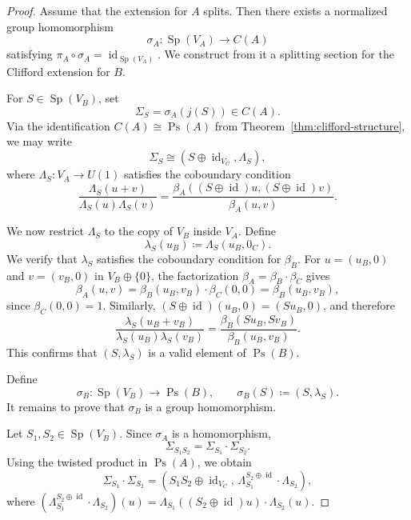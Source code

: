 \documentclass[11pt, reqno]{amsart}
\theoremstyle{definition}
\theoremstyle{remark}
\DeclareMathOperator{\Sp}{Sp}
\DeclareMathOperator{\Ps}{Ps}
\DeclareMathOperator{\id}{id}
\begin{document}
\begin{proof}
Assume that the extension for $A$ splits. Then there exists a normalized group homomorphism
\[
\sigma_A: \Sp(V_A) \to C(A)
\]
satisfying $\pi_A \circ \sigma_A = \id_{\Sp(V_A)}$. We construct from it a splitting section for the Clifford extension for $B$.

For $S \in \Sp(V_B)$, set
\[
\Sigma_S = \sigma_A(j(S)) \in C(A).
\]
Via the identification $C(A)\cong \Ps(A)$ from Theorem~\ref{thm:clifford-structure}, we may write
\begin{equation}
\Sigma_S \cong (S \oplus \id_{V_C}, \Lambda_S),
\end{equation}
where $\Lambda_S: V_A \to U(1)$ satisfies the coboundary condition
\begin{equation}
\frac{\Lambda_S(u+v)}{\Lambda_S(u)\Lambda_S(v)} = \frac{\beta_A((S\oplus \id)u, (S\oplus \id)v)}{\beta_A(u, v)}.
\end{equation}

We now restrict $\Lambda_S$ to the copy of $V_B$ inside $V_A$. Define
\begin{equation}
\lambda_S(u_B) \coloneqq \Lambda_S(u_B, 0_C).
\end{equation}
We verify that $\lambda_S$ satisfies the coboundary condition for $\beta_B$. For $u=(u_B,0)$ and $v=(v_B,0)$ in $V_B\oplus \{0\}$, the factorization $\beta_A=\beta_B\cdot \beta_C$ gives
\begin{equation}
\beta_A(u, v) = \beta_B(u_B, v_B) \cdot \beta_C(0, 0) = \beta_B(u_B, v_B),
\end{equation}
since $\beta_C(0,0)=1$. Similarly, $(S \oplus \id)(u_B, 0) = (Su_B, 0)$, and therefore
\begin{equation}
\frac{\lambda_S(u_B + v_B)}{\lambda_S(u_B)\lambda_S(v_B)} = \frac{\beta_B(Su_B, Sv_B)}{\beta_B(u_B, v_B)}.
\end{equation}
This confirms that $(S, \lambda_S)$ is a valid element of $\Ps(B)$.

Define
\[
\sigma_B:\Sp(V_B)\to \Ps(B),\qquad \sigma_B(S)\coloneqq (S,\lambda_S).
\]
It remains to prove that $\sigma_B$ is a group homomorphism.

Let $S_1, S_2 \in \Sp(V_B)$. Since $\sigma_A$ is a homomorphism,
\begin{equation}
\Sigma_{S_1 S_2} = \Sigma_{S_1} \cdot \Sigma_{S_2}.
\end{equation}
Using the twisted product in $\Ps(A)$, we obtain
\begin{equation}
\Sigma_{S_1} \cdot \Sigma_{S_2} = (S_1 S_2 \oplus \id_{V_C}, \, \Lambda_{S_1}^{S_2 \oplus \id} \cdot \Lambda_{S_2}),
\end{equation}
where $(\Lambda_{S_1}^{S_2 \oplus \id} \cdot \Lambda_{S_2})(u) = \Lambda_{S_1}((S_2 \oplus \id)u) \cdot \Lambda_{S_2}(u)$.


\end{proof}
\end{document}
